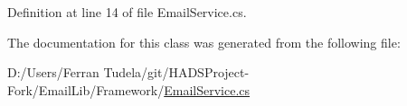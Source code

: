 Definition at line 14 of file Email\+Service.\+cs.



The documentation for this class was generated from the following file\+:\begin{DoxyCompactItemize}
\item 
D\+:/\+Users/\+Ferran Tudela/git/\+H\+A\+D\+S\+Project-\/\+Fork/\+Email\+Lib/\+Framework/\mbox{\hyperlink{EmailService_8cs}{Email\+Service.\+cs}}\end{DoxyCompactItemize}
